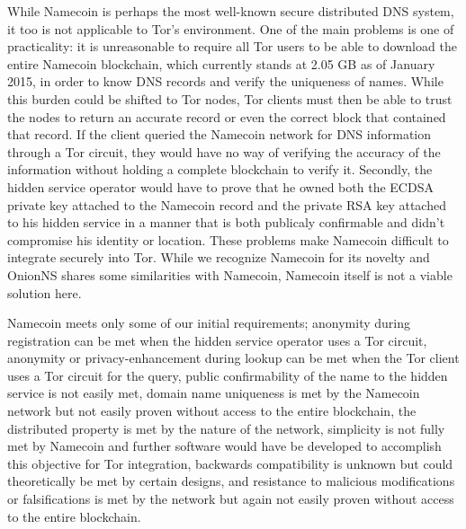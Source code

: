While Namecoin is perhaps the most well-known secure distributed DNS system, it too is not applicable to Tor's environment. One of the main problems is one of practicality: it is unreasonable to require all Tor users to be able to download the entire Namecoin blockchain, which currently stands at 2.05 GB as of January 2015,\cite{BitInfoCharts} in order to know DNS records and verify the uniqueness of names. While this burden could be shifted to Tor nodes, Tor clients must then be able to trust the nodes to return an accurate record or even the correct block that contained that record. If the client queried the Namecoin network for DNS information through a Tor circuit, they would have no way of verifying the accuracy of the information without holding a complete blockchain to verify it. Secondly, the hidden service operator would have to prove that he owned both the ECDSA private key attached to the Namecoin record and the private RSA key attached to his hidden service in a manner that is both publicaly confirmable and didn't compromise his identity or location. These problems make Namecoin difficult to integrate securely into Tor. While we recognize Namecoin for its novelty and OnionNS shares some similarities with Namecoin, Namecoin itself is not a viable solution here.

Namecoin meets only some of our initial requirements; anonymity during registration can be met when the hidden service operator uses a Tor circuit, anonymity or privacy-enhancement during lookup can be met when the Tor client uses a Tor circuit for the query, public confirmability of the name to the hidden service is not easily met, domain name uniqueness is met by the Namecoin network but not easily proven without access to the entire blockchain, the distributed property is met by the nature of the network, simplicity is not fully met by Namecoin and further software would have be developed to accomplish this objective for Tor integration, backwards compatibility is unknown but could theoretically be met by certain designs, and resistance to malicious modifications or falsifications is met by the network but again not easily proven without access to the entire blockchain.

